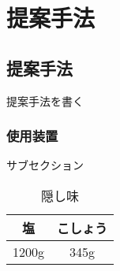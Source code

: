 \chapter{提案手法}
\thispagestyle{fancy}

\section{提案手法}
提案手法を書く

\subsection{使用装置}
サブセクション

\begin{table}[htb]
    \centering
     \begin{tabular}{cc}	\hline
       塩 & こしょう \\	\hline \hline
       1200g & 345g \\\hline
     \end{tabular}
    \caption{隠し味}
\end{table}


